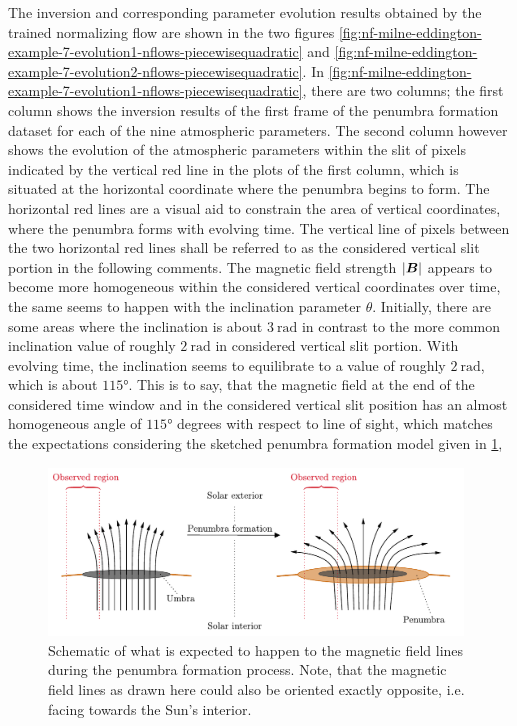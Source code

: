 \documentclass[a4paper,12pt]{report}
\def\lk#1{{\color{black}{#1}}}
\begin{document}
The inversion and corresponding parameter evolution results obtained by the trained normalizing flow are shown in the two figures \cref{fig:nf-milne-eddington-example-7-evolution1-nflows-piecewisequadratic} and \cref{fig:nf-milne-eddington-example-7-evolution2-nflows-piecewisequadratic}. In \cref{fig:nf-milne-eddington-example-7-evolution1-nflows-piecewisequadratic}, there are two columns; the first column shows the inversion results of the first frame of the penumbra formation dataset for each of the nine atmospheric parameters. The second column however shows the evolution of the atmospheric parameters within the slit of pixels indicated by the vertical red line in the plots of the first column, which is situated at the horizontal coordinate where the penumbra begins to form. The horizontal red lines are a visual aid to constrain the area of vertical coordinates, where the penumbra forms with evolving time. The vertical line of pixels between the two horizontal red lines shall be referred to as the considered vertical slit portion in the following comments. The magnetic field strength $|\bm{B}|$ appears to become more homogeneous within the considered vertical coordinates over time, the same seems to happen with the inclination parameter $\theta$. Initially, there are some areas where the inclination is about $\SI{3}{\radian}$ in contrast to the more common inclination value of roughly $\SI{2}{\radian}$ in \lk{the} considered vertical slit portion. With evolving time, the inclination seems to equilibrate to a value of roughly $\SI{2}{\radian}$, which is about $\ang{115}$. This is to say, that the magnetic field at the end of the considered time window and in the considered vertical slit position has an almost homogeneous angle of $\ang{115}$ degrees with respect to line of sight, which matches the expectations considering the sketched penumbra formation model given in \cref{fig:penumbraformation}, \lk{recalling that this means that the magnetic field lines are exactly inverse to the direction as shown in the figure.}
\begin{figure}[h!] %
\centering
\includegraphics[width=11cm]{figures/penumbraformation.pdf}
\caption{Schematic of what is expected to happen to the magnetic field lines during the penumbra formation process. Note, that the magnetic field lines as drawn here could also be oriented exactly opposite, i.e. facing towards the Sun's interior.}
\label{fig:penumbraformation}
\end{figure}
\end{document}
